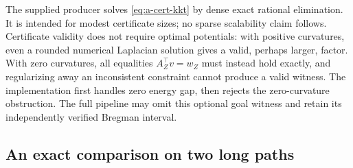 The supplied producer solves \eqref{eq:a-cert-kkt} by dense exact
rational elimination. It is intended for modest certificate sizes;
no sparse scalability claim follows. Certificate validity does not
require optimal potentials: with positive curvatures, even a rounded
numerical Laplacian solution gives a valid, perhaps larger, factor.
With zero curvatures, all equalities $A_Z^\top v=w_Z$ must instead
hold exactly, and regularizing away an inconsistent constraint cannot
produce a valid witness. The implementation first handles zero energy
gap, then rejects the zero-curvature obstruction. The full pipeline may
omit this optional goal witness and retain its independently verified
Bregman interval.

\subsection{An exact comparison on two long paths}

